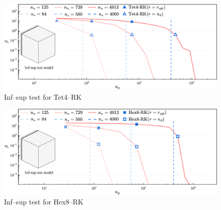 \begin{figure}[H]
\centering
\includegraphics[width=\textwidth]{Tet4.png}\caption{Inf--sup test for Tet4--RK}\label{fg:infsup_convergence_3D_a}
\end{figure}

\begin{figure}[H]
\centering
\includegraphics[width=\textwidth]{Hex8.png}\caption{Inf--sup test for Hex8--RK}\label{fg:infsup_convergence_3D_b}
\end{figure}

